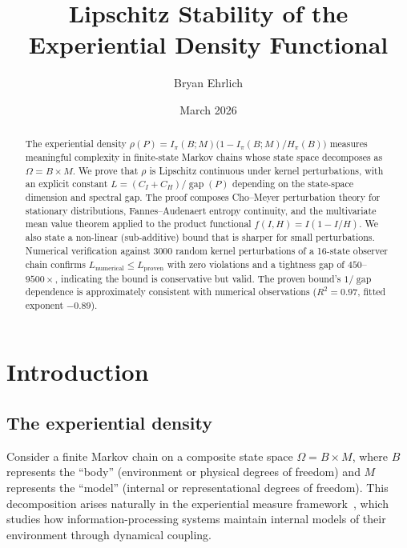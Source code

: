 \documentclass[11pt,a4paper]{article}
\title{Lipschitz Stability of the Experiential Density Functional}
\author{Bryan Ehrlich}
\date{March 2026}
\DeclareMathOperator{\gap}{gap}
\begin{document}
\maketitle

\begin{abstract}
The experiential density $\rho(P) = I_\pi(B;M)\bigl(1 - I_\pi(B;M)/H_\pi(B)\bigr)$
measures meaningful complexity in finite-state Markov chains whose state
space decomposes as $\Omega = B \times M$.  We prove that $\rho$ is
Lipschitz continuous under kernel perturbations, with an explicit constant
$L = (C_I + C_H)/\gap(P)$ depending on the state-space dimension and
spectral gap.  The proof composes Cho--Meyer perturbation theory for
stationary distributions, Fannes--Audenaert entropy continuity, and the
multivariate mean value theorem applied to the product functional
$f(I,H) = I(1 - I/H)$.  We also state a non-linear (sub-additive) bound
that is sharper for small perturbations.  Numerical verification against
3000 random kernel perturbations of a 16-state observer chain confirms
$L_{\mathrm{numerical}} \le L_{\mathrm{proven}}$ with zero violations
and a tightness gap of $450$--$9500\times$, indicating the bound is
conservative but valid.  The proven bound's $1/\gap$ dependence is approximately consistent
with numerical observations ($R^2 = 0.97$, fitted exponent $-0.89$).
\end{abstract}

\section{Introduction}

\subsection{The experiential density}

Consider a finite Markov chain on a composite state space
$\Omega = B \times M$, where $B$ represents the ``body'' (environment
or physical degrees of freedom) and $M$ represents the ``model''
(internal or representational degrees of freedom).  This decomposition
arises naturally in the experiential measure
framework~\cite{Ehrlich2026a}, which studies how information-processing
systems maintain internal models of their environment through dynamical
coupling.
\end{document}
